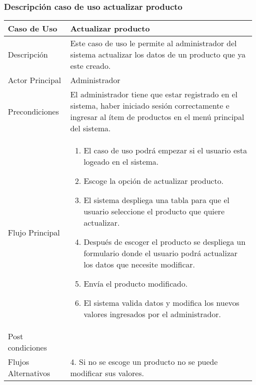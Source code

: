 \documentclass[12pt,a4paper]{article}
\begin{document}
    \subsubsection*{Descripción caso de uso actualizar producto}
    \begin{table}[h]
            \centering
            \begin{tabular}{| p{3cm}| p{11cm} |} 
            \hline  
            Caso de Uso         &    \textbf{Actualizar producto }   \\ 
            \hline
            Descripción         &  Este caso de uso le permite al administrador del sistema actualizar los datos de un producto que ya este creado.     \\ 
            \hline
            Actor Principal     & Administrador     \\ 
            \hline
            Precondiciones      & El administrador tiene que estar registrado en el sistema, haber iniciado sesión correctamente e ingresar al ítem de productos en el menú principal del sistema.    	\\
            \hline
            Flujo Principal     &    
    
                \begin{enumerate}
                    \item El caso de uso podrá empezar si el usuario esta logeado en el sistema.
                    \item Escoge la opción de actualizar producto.
                    \item El sistema despliega una tabla para que el usuario seleccione el producto que quiere actualizar.
                    \item Después de escoger el producto se despliega un formulario donde el usuario podrá actualizar los datos que necesite modificar.
                    \item Envía el producto modificado.
                    \item El sistema valida datos y modifica los nuevos valores ingresados por el administrador.
                \end{enumerate}
            \\  
            \hline
            Post condiciones    &       \\  
            \hline
            Flujos Alternativos &  4. Si no se escoge un producto no se puede modificar sus valores.     \\  
            \hline
            \end{tabular}
        \end{table}
\end{document}
